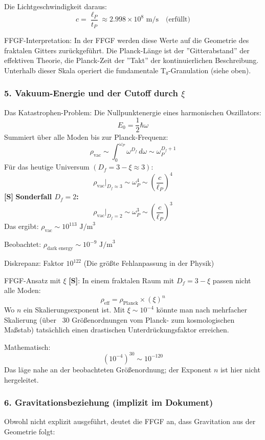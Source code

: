 	Die Lichtgeschwindigkeit daraus:
	\[
	c = \frac{\ell_P}{t_P} \approx 2.998 \times 10^8 \text{ m/s} \quad \text{(erfüllt)}
	\]
	
	FFGF-Interpretation:
	In der FFGF werden diese Werte auf die Geometrie des fraktalen Gitters zurückgeführt. Die Planck-Länge ist der ''Gitterabstand'' der effektiven Theorie, die Planck-Zeit der ''Takt'' der kontinuierlichen Beschreibung. Unterhalb dieser Skala operiert die fundamentale T₀-Granulation (siehe oben).
	
	\subsubsection{5. Vakuum-Energie und der Cutoff durch \( \xi \)}
	Das Katastrophen-Problem:
	Die Nullpunktenergie eines harmonischen Oszillators:
	\[
	E_0 = \frac{1}{2}\hbar\omega
	\]
	Summiert über alle Moden bis zur Planck-Frequenz:
	\[
	\rho_{\text{vac}} \sim \int_0^{\omega_P} \omega^{D_f} \, d\omega \sim \omega_P^{D_f+1}
	\]
	Für das heutige Universum \((D_f = 3-\xi \approx 3)\):
	\[
	\rho_{\text{vac}}\big|_{D_f \approx 3} \sim \omega_P^4 \sim \left(\frac{c}{\ell_P}\right)^4
	\]
	\textbf{[S]} \textbf{Sonderfall \(D_f = 2\):}
	\[
	\rho_{\text{vac}}\big|_{D_f=2} \sim \omega_P^3 \sim \left(\frac{c}{\ell_P}\right)^3
	\]
	Das ergibt: \( \rho_{\text{vac}} \sim 10^{113} \text{ J/m}^3 \)
	
	Beobachtet: \( \rho_{\text{dark energy}} \sim 10^{-9} \text{ J/m}^3 \)
	
	Diskrepanz: Faktor \( 10^{122} \) (Die größte Fehlanpassung in der Physik)
	
	FFGF-Ansatz mit \( \xi \) \textbf{[S]}:
	In einem fraktalen Raum mit \( D_f = 3 - \xi \) passen nicht alle Moden:
	\[
	\rho_{\text{eff}} = \rho_{\text{Planck}} \times (\xi)^n
	\]
	Wo \( n \) ein Skalierungsexponent ist. Mit \( \xi \sim 10^{-4} \) könnte man nach mehrfacher Skalierung (über ~30 Größenordnungen vom Planck- zum kosmologischen Maßstab) tatsächlich einen drastischen Unterdrückungsfaktor erreichen.
	
	Mathematisch:
	\[
	(10^{-4})^{30} \sim 10^{-120}
	\]
	Das läge nahe an der beobachteten Größenordnung; der Exponent \( n \) ist hier nicht hergeleitet.
	
	\subsubsection{6. Gravitationsbeziehung (implizit im Dokument)}
	Obwohl nicht explizit ausgeführt, deutet die FFGF an, dass Gravitation aus der Geometrie folgt:
	
